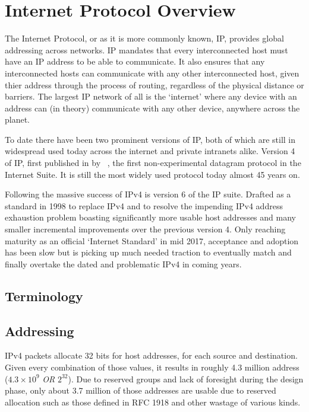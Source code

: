 
\section{Internet Protocol Overview}\label{sec:intro-ip}
The Internet Protocol, or as it is more commonly known, IP, provides global addressing across networks. IP mandates that every interconnected host must have an IP address to be able to communicate. It also ensures that any interconnected hosts can communicate with any other interconnected host, given thier address through the process of routing, regardless of the physical distance or barriers. The largest IP network of all is the `internet' where any device with an address can (in theory) communicate with any other device, anywhere across the planet.

To date there have been two prominent versions of IP, both of which are still in widespread used today across the internet and private intranets alike. Version 4 of IP, first published in \citeyear{cerf1974protocol} by \citeauthor{cerf1974protocol}~\cite{cerf1974protocol}, the first non-experimental datagram protocol in the Internet Suite. It is still the most widely used protocol today almost 45 years on.

Following the massive success of IPv4 is version 6 of the IP suite. Drafted as a standard in 1998 to replace IPv4 and to resolve the impending IPv4 address exhaustion problem boasting significantly more usable host addresses and many smaller incremental improvements over the previous version 4. Only reaching maturity as an official `Internet Standard' in mid 2017, acceptance and adoption has been slow but is picking up much needed traction to eventually match and finally overtake the dated and problematic IPv4 in coming years.

    \subsection{Terminology}

    \subsection{Addressing}
    IPv4 packets allocate 32 bits for host addresses, for each source and destination. Given every combination of those values, it results in roughly 4.3 million address ($4.3 \times 10^{9}$ \textit{OR} $2^{32}$). Due to reserved groups and lack of foresight during the design phase, only about 3.7 million of those addresses are usable due to reserved allocation such as those defined in RFC 1918 and other wastage of various kinds.

